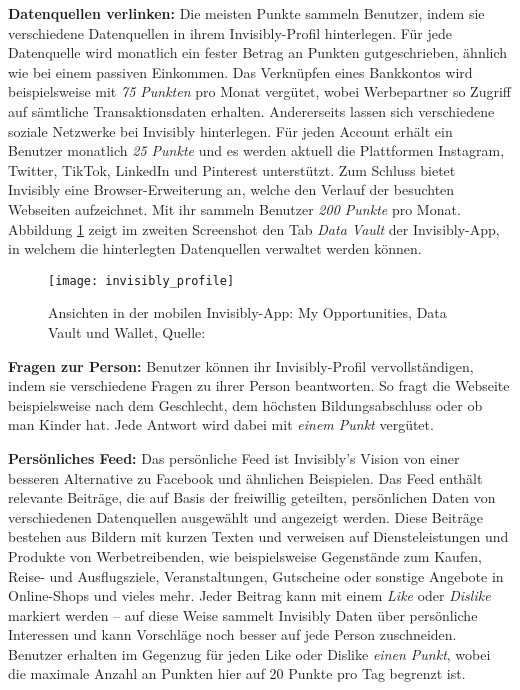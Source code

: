 \noindent \textbf{Datenquellen verlinken:} Die meisten Punkte sammeln Benutzer, indem sie verschiedene Datenquellen in ihrem Invisibly-Profil hinterlegen. Für jede Datenquelle wird monatlich ein fester Betrag an Punkten gutgeschrieben, ähnlich wie bei einem passiven Einkommen. \cite{pymntsInvisibly_2021} Das Verknüpfen eines Bankkontos wird beispielsweise mit \textit{75 Punkten} pro Monat vergütet, wobei Werbepartner so Zugriff auf sämtliche Transaktionsdaten erhalten. Andererseits lassen sich verschiedene soziale Netzwerke bei Invisibly hinterlegen. Für jeden Account erhält ein Benutzer monatlich \textit{25 Punkte} und es werden aktuell die Plattformen Instagram, Twitter, TikTok, LinkedIn und Pinterest unterstützt. Zum Schluss bietet Invisibly eine Browser-Erweiterung an, welche den Verlauf der besuchten Webseiten aufzeichnet. Mit ihr sammeln Benutzer \textit{200 Punkte} pro Monat. \cite{instagramInvisibly_2021, lifewireInvisibly_2021} Abbildung \ref{fig:invisiblyProfile} zeigt im zweiten Screenshot den Tab \textit{Data Vault} der Invisibly-App, in welchem die hinterlegten Datenquellen verwaltet werden können. \newline

\begin{figure}[!ht]
	\centering
	\texttt{[image: invisibly\_profile]}
	\caption{Ansichten in der mobilen Invisibly-App: My Opportunities, Data Vault und Wallet, Quelle: \cite{behanceInvisibly_2021}}
	\label{fig:invisiblyProfile}
\end{figure}

\noindent \textbf{Fragen zur Person:} Benutzer können ihr Invisibly-Profil vervollständigen, indem sie verschiedene Fragen zu ihrer Person beantworten. So fragt die Webseite beispielsweise nach dem Geschlecht, dem höchsten Bildungsabschluss oder ob man Kinder hat. Jede Antwort wird dabei mit \textit{einem Punkt} vergütet. \cite{instagramInvisibly_2021} \newline

\noindent \textbf{Persönliches Feed:} Das persönliche Feed ist Invisibly's Vision von einer besseren Alternative zu Facebook und ähnlichen Beispielen. Das Feed enthält relevante Beiträge, die auf Basis der freiwillig geteilten, persönlichen Daten von verschiedenen Datenquellen ausgewählt und angezeigt werden. Diese Beiträge bestehen aus Bildern mit kurzen Texten und verweisen auf Diensteleistungen und Produkte von Werbetreibenden, wie beispielsweise Gegenstände zum Kaufen, Reise- und Ausflugsziele, Veranstaltungen, Gutscheine oder sonstige Angebote in Online-Shops und vieles mehr. Jeder Beitrag kann mit einem \textit{Like} oder \textit{Dislike} markiert werden -- auf diese Weise sammelt Invisibly Daten über persönliche Interessen und kann Vorschläge noch besser auf jede Person zuschneiden. Benutzer erhalten im Gegenzug für jeden Like oder Dislike \textit{einen Punkt}, wobei die maximale Anzahl an Punkten hier auf 20 Punkte pro Tag begrenzt ist. \cite{invisiblyWhyPay_2021} \newline


